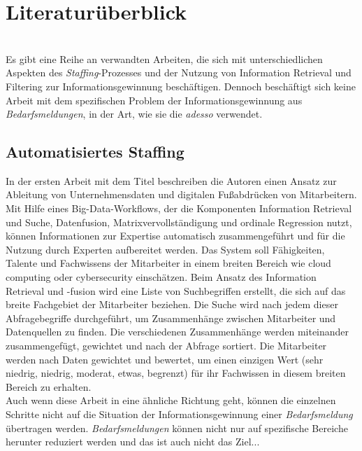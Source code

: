 \chapter{Literaturüberblick}
\\
Es gibt eine Reihe an verwandten Arbeiten, die sich mit unterschiedlichen Aspekten des \emph{Staffing}-Prozesses und der Nutzung von Information Retrieval und Filtering zur Informationsgewinnung beschäftigen. Dennoch beschäftigt sich keine Arbeit mit dem spezifischen Problem der Informationsgewinnung aus \emph{Bedarfsmeldungen}, in der Art, wie sie die \emph{adesso} verwendet.

\section{Automatisiertes Staffing}
In der ersten Arbeit mit dem Titel \cite{horesh2016information} beschreiben die Autoren \citeauthor{horesh2016information} einen Ansatz zur Ableitung von Unternehmensdaten und digitalen Fußabdrücken von Mitarbeitern. Mit Hilfe eines Big-Data-Workflows, der die Komponenten Information Retrieval und Suche, Datenfusion, Matrixvervollständigung und ordinale Regression nutzt, können Informationen zur Expertise automatisch zusammengeführt und für die Nutzung durch Experten aufbereitet werden. Das System soll Fähigkeiten, Talente und Fachwissens der Mitarbeiter in einem breiten Bereich wie cloud computing oder cybersecurity einschätzen. Beim Ansatz des Information Retrieval und -fusion wird eine Liste von Suchbegriffen erstellt, die sich auf das breite Fachgebiet der Mitarbeiter beziehen. Die Suche wird nach jedem dieser Abfragebegriffe durchgeführt, um Zusammenhänge zwischen Mitarbeiter und Datenquellen zu finden. Die verschiedenen Zusammenhänge werden miteinander zusammengefügt, gewichtet und nach der Abfrage sortiert. Die Mitarbeiter werden nach Daten gewichtet und bewertet, um einen einzigen Wert (sehr niedrig, niedrig, moderat, etwas, begrenzt) für ihr Fachwissen in diesem breiten Bereich zu erhalten.\\

Auch wenn diese Arbeit in eine ähnliche Richtung geht, können die einzelnen Schritte nicht auf die Situation der Informationsgewinnung einer \emph{Bedarfsmeldung} übertragen werden. \emph{Bedarfsmeldungen} können nicht nur auf spezifische Bereiche herunter reduziert werden und das ist auch nicht das Ziel... 


